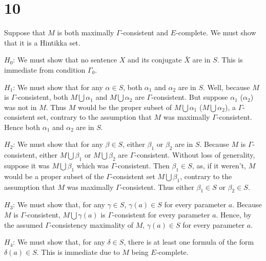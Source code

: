 \documentclass{article}
\theoremstyle{definition}
\begin{document}
\section*{10}
Suppose that $M$ is both maximally $\Gamma$-consistent and $E$-complete. We must show that it is a Hintikka set.


$H_0$: We must show that no sentence $X$ and its conjugate $\bar{X}$ are in $S$. This is immediate from condition $\Gamma_0$.


$H_1$: We must show that for any $\alpha\in S$, both $\alpha_1$ and $\alpha_2$ are in $S$. Well, because $M$ is $\Gamma$-consistent, 
both $M\bigcup {\alpha_1}$ and $M\bigcup {\alpha_2}$ are $\Gamma$-consistent. But suppose $\alpha_1$ ($\alpha_2$) was not in $M$. Thus 
$M$ would be the proper subset of $M\bigcup {\alpha_1}$ ($M\bigcup {\alpha_2}$), a $\Gamma$-consistent set, contrary to the assumption that 
$M$ was maximally $\Gamma$-consistent. Hence both $\alpha_1$ and $\alpha_2$ are in $S$.


$H_2$: We must show that for any $\beta\in S$, either $\beta_1$ or $\beta_2$ are in $S$. Because $M$ is $\Gamma$-consistent, either 
$M\bigcup {\beta_1}$ or $M\bigcup {\beta_2}$ are $\Gamma$-consistent. Without loss of generality, suppose it was 
$M\bigcup {\beta_1}$ which was $\Gamma$-consistent. Then $\beta_1\in S$, as, if it weren't, $M$ would be a proper subset of the $\Gamma$-consistent 
set $M\bigcup {\beta_1}$, contrary to the assumption that $M$ was maximally $\Gamma$-consistent. Thus either $\beta_1\in S$ or $\beta_2\in S$.

$H_3$: We must show that, for any $\gamma\in S$, $\gamma\left(a\right)\in S$ for every parameter $a$. Because $M$ is $\Gamma$-consistent, 
$M\bigcup {\gamma\left(a\right)}$ is $\Gamma$-consistent for every parameter $a$. Hence, by the assumed $\Gamma$-consistency maximality of $M$, 
$\gamma\left(a\right)\in S$ for every parameter $a$.

$H_4$: We must show that, for any $\delta\in S$, there is at least one formula of the form $\delta\left(a\right)\in S$. This is immediate due to $M$ 
being $E$-complete.
\end{document}
